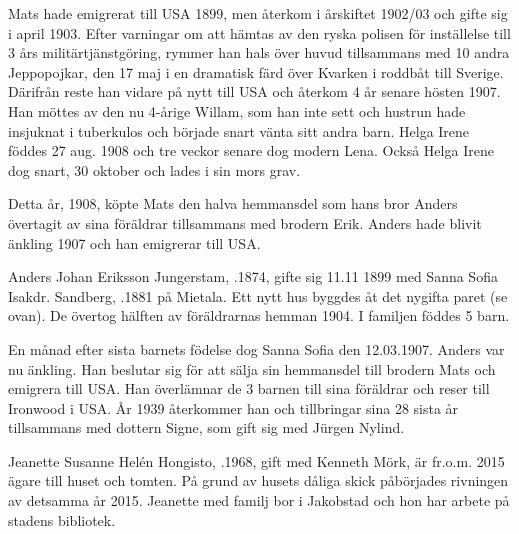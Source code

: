 Mats hade emigrerat till USA 1899, men återkom i årskiftet 1902/03 och gifte sig i april 1903. Efter varningar om att hämtas av den ryska polisen för inställelse till 3 års militärtjänstgöring, rymmer han hals över huvud tillsammans med 10 andra Jeppopojkar, den 17 maj i en dramatisk färd över Kvarken i roddbåt till Sverige. Därifrån reste han vidare på nytt till USA och återkom 4 år senare hösten 1907. Han möttes av den nu 4-årige Willam, som han inte sett och  hustrun hade insjuknat i tuberkulos och började snart vänta sitt andra barn. Helga Irene föddes 27 aug. 1908 och tre veckor senare dog modern Lena. Också Helga Irene dog snart, 30 oktober och lades i sin mors grav.

Detta år, 1908, köpte Mats den halva hemmansdel som hans bror Anders övertagit av sina föräldrar tillsammans med brodern Erik. Anders hade blivit änkling 1907 och han emigrerar till USA.


Anders Johan Eriksson Jungerstam, .1874, gifte sig 11.11 1899 med Sanna Sofia Isakdr. Sandberg, .1881 på Mietala. Ett nytt hus byggdes åt det nygifta paret (se ovan). De övertog hälften av föräldrarnas hemman 1904. I familjen föddes 5 barn.
\begin{jhchildren}
  \item {}
  \item {}
  \item {}
  \item {}
  \item {}
\end{jhchildren}
En månad efter sista barnets födelse dog Sanna Sofia den 12.03.1907. Anders var nu änkling. Han beslutar sig för att sälja sin hemmansdel till brodern Mats och emigrera till USA. Han överlämnar de 3 barnen till sina föräldrar och reser till Ironwood i USA. År 1939 återkommer han och tillbringar sina 28 sista år tillsammans med dottern Signe, som gift sig med Jürgen Nylind.





Jeanette Susanne Helén Hongisto, .1968, gift med Kenneth Mörk, är fr.o.m. 2015 ägare till huset och tomten. På grund av husets dåliga skick påbörjades rivningen av detsamma år 2015. Jeanette med familj bor i Jakobstad och hon har arbete på stadens bibliotek.


